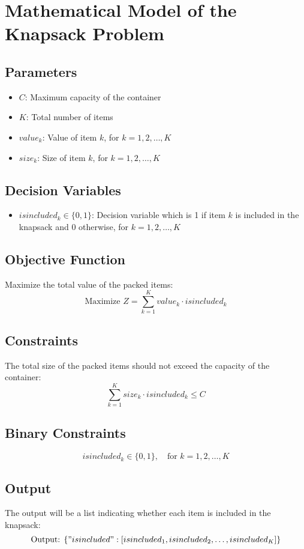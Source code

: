 \documentclass{article}
\begin{document}
\section*{Mathematical Model of the Knapsack Problem}

\subsection*{Parameters}
\begin{itemize}
    \item $C$: Maximum capacity of the container
    \item $K$: Total number of items
    \item $value_k$: Value of item $k$, for $k = 1, 2, \ldots, K$
    \item $size_k$: Size of item $k$, for $k = 1, 2, \ldots, K$
\end{itemize}

\subsection*{Decision Variables}
\begin{itemize}
    \item $isincluded_k \in \{0, 1\}$: Decision variable which is 1 if item $k$ is included in the knapsack and 0 otherwise, for $k = 1, 2, \ldots, K$
\end{itemize}

\subsection*{Objective Function}
Maximize the total value of the packed items:
\[
\text{Maximize } Z = \sum_{k=1}^{K} value_k \cdot isincluded_k
\]

\subsection*{Constraints}
The total size of the packed items should not exceed the capacity of the container:
\[
\sum_{k=1}^{K} size_k \cdot isincluded_k \leq C
\]

\subsection*{Binary Constraints}
\[
isincluded_k \in \{0, 1\}, \quad \text{for } k = 1, 2, \ldots, K
\]

\subsection*{Output}
The output will be a list indicating whether each item is included in the knapsack:
\[
\text{Output: } \{ "isincluded": [isincluded_1, isincluded_2, \ldots, isincluded_K] \}
\]
\end{document}
